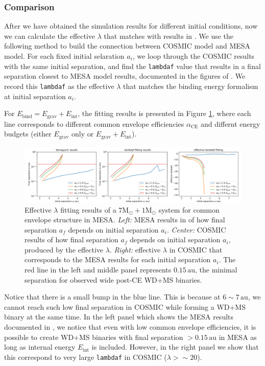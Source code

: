\documentclass[12pt]{article}
\newcommand{\Msun}{\mathrm{M_{\odot}}}
\newcommand{\alphace}{\alpha_{\mathrm{CE}}}
\newcommand{\Ebind}{E_{\mathrm{bind}}}
\newcommand{\Egrav}{E_{\mathrm{grav}}}
\newcommand{\Eint}{E_{\mathrm{int}}}
\newcommand{\au}{\, \mathrm{au}}
\begin{document}
\subsubsection{Comparison}
After we have obtained the simulation results for different initial conditions, now we can calculate the effective $\lambda$ that matches with results in \cite{yamaguchi_hi}. We use the following method to build the connection between COSMIC model and MESA model. For each fixed initial selaration $a_i$, we loop through the COSMIC results with the same initial separation, and find the \verb|lambdaf| value that results in a final separation closest to MESA model results, documented in the figures of \cite{yamaguchi_hi}. We record this \verb|lambdaf| as the effective $\lambda$ that matches the binding energy formalism at initial separation $a_i$.

For $\Ebind = \Egrav + \Eint$, the fitting results is presented in Figure \ref{fit_hi}, where each line corresponds to different common envelope efficiencies $\alphace$ and differnt energy budgets (either $\Egrav$ only or $\Egrav + \Eint$).

\begin{figure}
    \centering
    \includegraphics[width=1\linewidth]{7+1fit.png}
    \caption{Effective $\lambda$ fitting results of a $7\Msun + 1\Msun$ system for common envelope structure in MESA. \emph{Left:} MESA results in \cite{yamaguchi_hi} of how final separation $a_f$ depends on initial separation $a_i$. \emph{Center:} COSMIC results of how final separation $a_f$ depends on initial separation $a_i$, produced by the effective $\lambda$. \emph{Right:} effective $\lambda$ in COSMIC that corresponds to the MESA results for each initial separation $a_i$. The red line in the left and middle panel represents $0.15 \au$, the minimal separation for observed wide post-CE WD+MS binaries.}
    \label{fit_hi}
\end{figure}

Notice that there is a small bump in the blue line. This is because at $6 \sim 7 \au$, we cannot reach such low final separation in COSMIC while forming a WD+MS binary at the same time. In the left panel which shows the MESA results documented in \cite{yamaguchi_hi}, we notice that even with low common envelope efficiencies, it is possible to create WD+MS binaries with final separation $>0.15 \au$ in MESA as long as internal energy $\Eint$ is included. However, in the right panel we show that this correspond to very large \verb|lambdaf| in COSMIC ($\lambda > \sim 20$).
\end{document}
